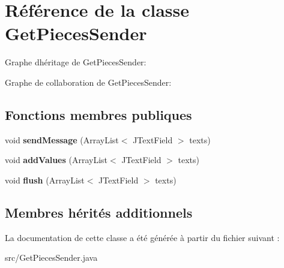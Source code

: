 \hypertarget{classGetPiecesSender}{}\section{Référence de la classe Get\+Pieces\+Sender}
\label{classGetPiecesSender}


Graphe d\textquotesingle{}héritage de Get\+Pieces\+Sender\+:


Graphe de collaboration de Get\+Pieces\+Sender\+:
\subsection*{Fonctions membres publiques}
\begin{DoxyCompactItemize}
\item 
\mbox{\label{classGetPiecesSender_a7c1960cb944b891f31055844486257ad}} 
void {\bfseries send\+Message} (Array\+List$<$ J\+Text\+Field $>$ texts)
\item 
\mbox{\label{classGetPiecesSender_ab6ea1b7181645d7579356e1611f36d45}} 
void {\bfseries add\+Values} (Array\+List$<$ J\+Text\+Field $>$ texts)
\item 
\mbox{\label{classGetPiecesSender_a12076896cbc5ff57cf953015b934c929}} 
void {\bfseries flush} (Array\+List$<$ J\+Text\+Field $>$ texts)
\end{DoxyCompactItemize}
\subsection*{Membres hérités additionnels}


La documentation de cette classe a été générée à partir du fichier suivant \+:\begin{DoxyCompactItemize}
\item 
src/Get\+Pieces\+Sender.\+java\end{DoxyCompactItemize}
